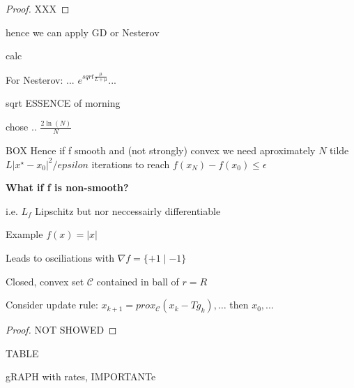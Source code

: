 
\begin{proof}[Proof]
	XXX
\end{proof}

hence we can apply GD or Nesterov

calc


For Nesterov:
... $e^{sqrt{\frac{\mu}{L + \mu}}}$...

sqrt ESSENCE of morning

chose .. $\frac{2\ln(N)}{N}$

BOX
Hence if f smooth and (not strongly) convex we need
aproximately $N$ tilde $L|x^\star - x_0|^2/epsilon$ iterations
to reach $f(x_N)-f(x_0)\le \epsilon$
%
%

\textbf{What if f is non-smooth?}

i.e. $L_f$ Lipschitz but nor neccessairly differentiable

Example $f(x)=|x|$

Leads to osciliations with $\nabla f = \{+1\mid-1\}$

\begin{proposition}
	Closed, convex set $\mathcal{C}$ contained in ball of $r=R$

	Consider update rule:
	$x_{k+1}=prox_\mathcal{C}(x_k-Tg_k), \dots$
	then $x_0,...$
\end{proposition}

\begin{proof}[Proof]
	NOT SHOWED

\end{proof}

TABLE

gRAPH with rates, IMPORTANTe
